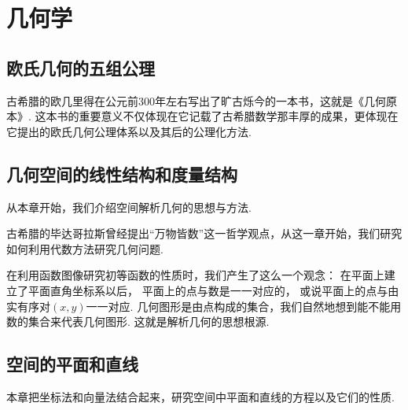 \part{几何学}

\chapter{欧氏几何的五组公理}
古希腊的欧几里得在公元前300年左右写出了旷古烁今的一本书，这就是《几何原本》.
这本书的重要意义不仅体现在它记载了古希腊数学那丰厚的成果，更体现在它提出的欧氏几何公理体系以及其后的公理化方法.










\chapter{几何空间的线性结构和度量结构}
从本章开始，我们介绍空间解析几何的思想与方法.

古希腊的毕达哥拉斯曾经提出“万物皆数”这一哲学观点，从这一章开始，我们研究如何利用代数方法研究几何问题.

在利用函数图像研究初等函数的性质时，我们产生了这么一个观念：
在平面上建立了平面直角坐标系以后，
平面上的点与数是一一对应的，
或说平面上的点与由实有序对\((x,y)\)一一对应.
几何图形是由点构成的集合，我们自然地想到能不能用数的集合来代表几何图形.
这就是解析几何的思想根源.







\chapter{空间的平面和直线}
本章把坐标法和向量法结合起来，研究空间中平面和直线的方程以及它们的性质.






